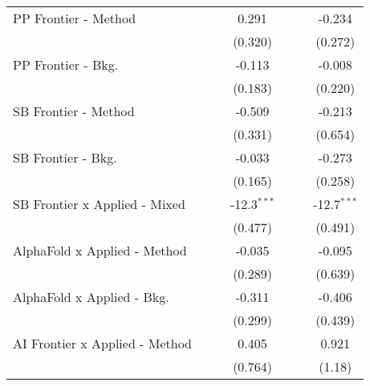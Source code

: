 \begin{tabular}{lcccccc}
   PP Frontier - Method           &               &               & 0.291         &               &               & -0.234\\   
                                  &               &               & (0.320)       &               &               & (0.272)\\   
   PP Frontier - Bkg.             &               &               & -0.113        &               &               & -0.008\\   
                                  &               &               & (0.183)       &               &               & (0.220)\\   
   SB Frontier - Method           &               &               & -0.509        &               &               & -0.213\\   
                                  &               &               & (0.331)       &               &               & (0.654)\\   
   SB Frontier - Bkg.             &               &               & -0.033        &               &               & -0.273\\   
                                  &               &               & (0.165)       &               &               & (0.258)\\   
   SB Frontier x Applied - Mixed  &               &               & -12.3$^{***}$ &               &               & -12.7$^{***}$\\   
                                  &               &               & (0.477)       &               &               & (0.491)\\   
   AlphaFold x Applied - Method   &               &               & -0.035        &               &               & -0.095\\   
                                  &               &               & (0.289)       &               &               & (0.639)\\   
   AlphaFold x Applied - Bkg.     &               &               & -0.311        &               &               & -0.406\\   
                                  &               &               & (0.299)       &               &               & (0.439)\\   
   AI Frontier x Applied - Method &               &               & 0.405         &               &               & 0.921\\   
                                  &               &               & (0.764)       &               &               & (1.18)\\   

\end{tabular}
